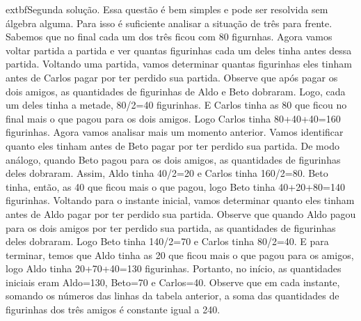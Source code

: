 \begin{solution}
\medskip
	extbf{Segunda solução.}
Essa questão é bem simples e pode ser resolvida sem álgebra alguma. Para isso é suficiente analisar a situação de três para frente.
Sabemos que no final cada um dos três ficou com 80 figurnhas. 
Agora vamos voltar partida a partida e ver quantas figurinhas cada um deles tinha antes dessa partida. 
Voltando uma partida, vamos determinar quantas figurinhas eles tinham antes de Carlos pagar por ter perdido sua partida. Observe que após pagar os dois amigos, as quantidades de figurinhas de Aldo e Beto dobraram.
Logo, cada um deles tinha a metade, 80/2=40 figurinhas. E Carlos tinha as 80 que ficou no final mais o que pagou para os dois amigos.
Logo Carlos tinha 80+40+40=160 figurinhas.
Agora vamos analisar mais um momento anterior. Vamos identificar quanto eles tinham antes de Beto pagar por ter perdido sua partida.
De modo análogo, quando Beto pagou para os dois amigos, as quantidades de figurinhas deles dobraram.
Assim, Aldo tinha 40/2=20 e Carlos tinha 160/2=80. 
Beto tinha, então, as 40 que ficou mais o que pagou, logo Beto tinha 40+20+80=140 figurinhas.
Voltando para o instante inicial, vamos determinar quanto eles tinham antes de Aldo pagar por ter perdido sua partida.
Observe que quando Aldo pagou para os dois amigos por ter perdido sua partida, as quantidades de figurinhas deles dobraram.
Logo Beto tinha 140/2=70 e  Carlos tinha 80/2=40.
E para terminar, temos que Aldo tinha as 20 que ficou mais o que pagou para os amigos, logo Aldo tinha 20+70+40=130 figurinhas.
Portanto, no início, as quantidades iniciais eram Aldo=130, Beto=70 e Carlos=40.
\medskip
Observe que em cada instante, somando os números das linhas da tabela anterior, a soma das quantidades de figurinhas dos três amigos é constante igual a 240.
\end{solution}

